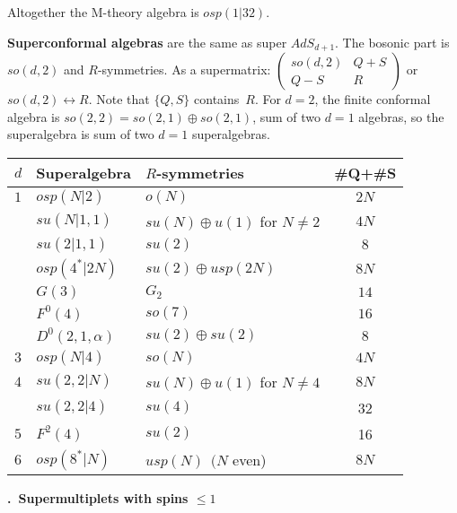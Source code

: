 \documentclass[10pt,letterpaper]{article}
\renewcommand{\section}[1]{\stepcounter{section}\medskip\pagebreak[1]\noindent\textbf{\large\arabic{section}.\ #1}\smallskip}
\renewcommand{\paragraph}[1]{\textbf{#1}}
\begin{document}
\noindent Altogether the M-theory algebra is $osp(1|32)$.

\smallskip

\paragraph{Superconformal algebras} are the same as super $AdS_{d+1}$.
The bosonic part is $so(d,2)$ and $R$-symmetries.
As a supermatrix: $\begin{pmatrix}so(d,2)& Q+S\\ Q-S&R\end{pmatrix}$ or $so(d,2)\leftrightarrow R$.  Note that $\{Q,S\}$ contains~$R$.
For $d=2$, the finite conformal algebra is $so(2,2)=so(2,1)\oplus so(2,1)$, sum of two $d=1$ algebras, so the superalgebra is sum of two $d=1$ superalgebras.
\begin{center}
\vspace{-.5\baselineskip}
\begin{tabular}{lllc}\toprule
$d$& Superalgebra& $R$-symmetries & \#Q+\#S\\ \midrule
$1$&  $osp(N|2)$ & $o(N)$    & $2N$ \\
   &  $su(N|1,1)$  &$su(N)\oplus u(1)$ for $N\neq 2$ &$ 4N$ \\
   &  $su(2|1,1)           $    &$su(2)              $ &$ 8   $\\
   &  $osp(4^*|2N)         $    &$su(2)\oplus usp(2N)$ &$ 8N  $\\
   &  $G(3)                $    &$G_2                $ &$ 14  $\\
   &  $F^0(4)                $    &$so(7)              $ &$ 16  $\\
   &  $D^0(2,1,\alpha)     $    &$su(2)\oplus su(2)  $ &$  8  $\\  \midrule
$3$&$ osp(N|4)   $ &$ so(N) $&$ 4N $\\   \midrule
$4$&$ su(2,2|N)  $ &$su(N)\oplus u(1)$ for $N\neq 4$&$ 8N$\\
   &$ su(2,2|4)  $ &$  su(4)$ & 32\\  \midrule
$5$&$ F^2(4)       $ &$ su(2) $ & 16 \\       \midrule
$6$&$ osp(8^*|N) $ &$  usp(N)\ \ (N $ even)& $8N$ \\
\bottomrule
\end{tabular}
\end{center}


\section{Supermultiplets with spins $\leq 1$}
\end{document}
